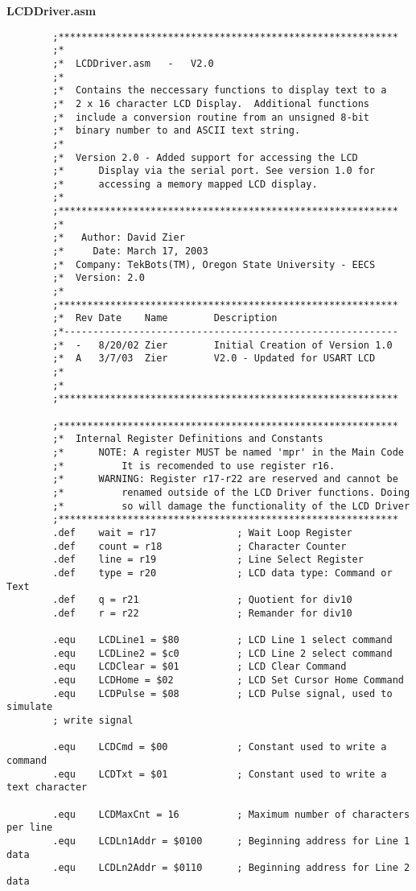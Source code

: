 \documentclass[12pt,letterpaper]{article}
\begin{document}
    \textbf{LCDDriver.asm}
    \begin{verbatim}
	    ;***********************************************************
	    ;*
	    ;*	LCDDriver.asm	-	V2.0
	    ;*
	    ;*	Contains the neccessary functions to display text to a
	    ;*	2 x 16 character LCD Display.  Additional functions
	    ;*	include a conversion routine from an unsigned 8-bit
	    ;*	binary number to and ASCII text string.
	    ;*
	    ;*	Version 2.0 - Added support for accessing the LCD 
	    ;*		Display via the serial port. See version 1.0 for 
	    ;*		accessing a memory mapped LCD display.
	    ;*
	    ;***********************************************************
	    ;*
	    ;*	 Author: David Zier
	    ;*	   Date: March 17, 2003
	    ;*	Company: TekBots(TM), Oregon State University - EECS
	    ;*	Version: 2.0
	    ;*
	    ;***********************************************************
	    ;*	Rev	Date	Name		Description
	    ;*----------------------------------------------------------
	    ;*	-	8/20/02	Zier		Initial Creation of Version 1.0
	    ;*	A	3/7/03	Zier		V2.0 - Updated for USART LCD
	    ;*
	    ;*
	    ;***********************************************************
	    
	    ;***********************************************************
	    ;*	Internal Register Definitions and Constants
	    ;*		NOTE: A register MUST be named 'mpr' in the Main Code
	    ;*			It is recomended to use register r16.
	    ;*		WARNING: Register r17-r22 are reserved and cannot be
	    ;*			renamed outside of the LCD Driver functions. Doing
	    ;*			so will damage the functionality of the LCD Driver
	    ;***********************************************************
	    .def	wait = r17				; Wait Loop Register
	    .def	count = r18				; Character Counter
	    .def	line = r19				; Line Select Register
	    .def	type = r20				; LCD data type: Command or Text
	    .def	q = r21					; Quotient for div10
	    .def	r = r22					; Remander for div10
	    
	    .equ	LCDLine1 = $80			; LCD Line 1 select command
	    .equ	LCDLine2 = $c0			; LCD Line 2 select command
	    .equ	LCDClear = $01			; LCD Clear Command
	    .equ	LCDHome = $02			; LCD Set Cursor Home Command
	    .equ	LCDPulse = $08			; LCD Pulse signal, used to simulate 
	    ; write signal
	    
	    .equ	LCDCmd = $00			; Constant used to write a command 
	    .equ	LCDTxt = $01			; Constant used to write a text character
	    
	    .equ	LCDMaxCnt = 16			; Maximum number of characters per line
	    .equ	LCDLn1Addr = $0100		; Beginning address for Line 1 data
	    .equ	LCDLn2Addr = $0110		; Beginning address for Line 2 data
	    

\end{verbatim}
\end{document}
